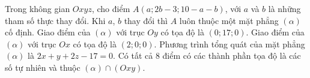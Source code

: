 \begin{ex}
Trong không gian $Oxyz$, cho điểm $A(a;2b-3;10-a-b)$, với $a$ và $b$ là những tham số thực thay đổi. Khi $a$, $b$ thay đổi thì $A$ luôn thuộc một mặt phẳng $(\alpha)$ cố định.
\choiceTF
{\True Giao điểm của $(\alpha)$ với trục $Oy$ có tọa độ là $(0;17;0)$.}
{Giao điểm của $(\alpha)$ với trục $Ox$ có tọa độ là $(2;0;0)$.}
{\True Phương trình tổng quát của mặt phẳng $(\alpha)$ là $2x+y+2z-17=0$.}
{Có tất cả $8$ điểm có các thành phần tọa độ là các số tự nhiên và thuộc $(\alpha)\cap(Oxy)$.}
\end{ex}
